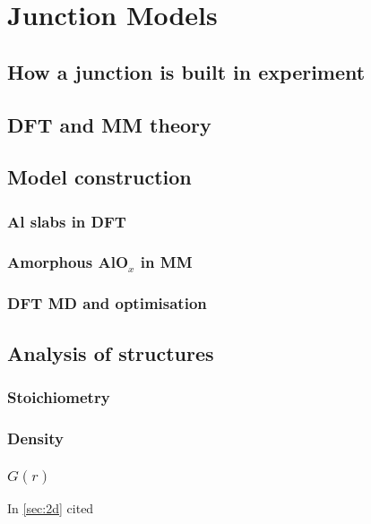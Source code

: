 \chapter{Junction Models}
\section{How a junction is built in experiment}
\section{DFT and MM theory}
\section{Model construction}
\subsection{Al slabs in DFT}
\subsection{Amorphous \texorpdfstring{AlO$_{x}$}{AlOₓ} in MM}
\subsection{DFT MD and optimisation}
\section{Analysis of structures}
\subsection{Stoichiometry}
\subsection{Density}
\subsection{\texorpdfstring{$G(r)$}{G(r)}}
In \cref{sec:2d} cited \cite{Xu1997} 